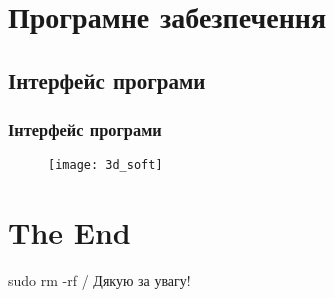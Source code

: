 \documentclass[ucs]{beamer}
\begin{document}
\section{Програмне забезпечення} 
\subsection{Інтерфейс програми} 
\begin{frame}%
\frametitle{Інтерфейс програми}
\begin{figure}
\centering
\texttt{[image: 3d\_soft]}
\end{figure}
\end{frame}









\section{The End} 

\begin{frame}%
\begin{block}{sudo rm -rf / }
Дякую за увагу!
\end{block}


\end{frame}
\end{document}

